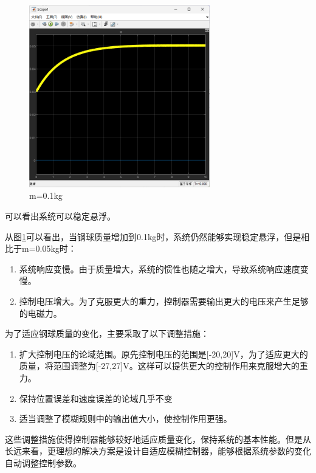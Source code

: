 \documentclass[12pt,a4paper,UTF8]{article}
\begin{document}
\begin{figure}[htbp] \centering \includegraphics[width=0.7\textwidth]{figures/2024-12-13-23-46-34.png} \caption{m=0.1kg} \label{fig:m01} \end{figure}

可以看出系统可以稳定悬浮。

从图\ref{fig:m01}可以看出，当钢球质量增加到0.1kg时，系统仍然能够实现稳定悬浮，但是相比于m=0.05kg时：

\begin{enumerate}
\item 系统响应变慢。由于质量增大，系统的惯性也随之增大，导致系统响应速度变慢。

\item 控制电压增大。为了克服更大的重力，控制器需要输出更大的电压来产生足够的电磁力。
\end{enumerate}

为了适应钢球质量的变化，主要采取了以下调整措施：

\begin{enumerate}
\item 扩大控制电压的论域范围。原先控制电压的范围是[-20,20]V，为了适应更大的质量，将范围调整为[-27,27]V。这样可以提供更大的控制作用来克服增大的重力。

\item 保持位置误差和速度误差的论域几乎不变

\item 适当调整了模糊规则中的输出值大小，使控制作用更强。
\end{enumerate}

这些调整措施使得控制器能够较好地适应质量变化，保持系统的基本性能。但是从长远来看，更理想的解决方案是设计自适应模糊控制器，能够根据系统参数的变化自动调整控制参数。
\end{document}
